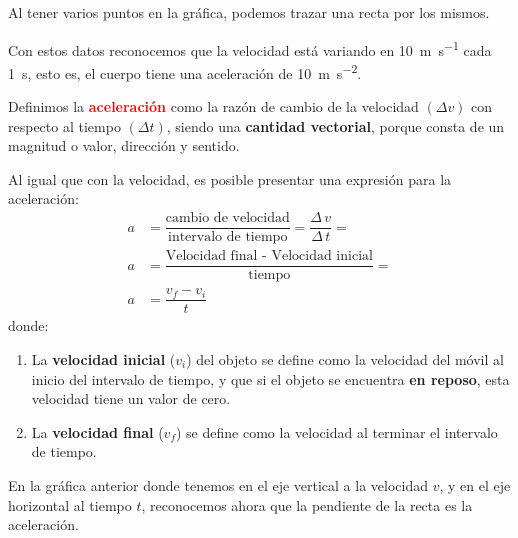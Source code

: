 \documentclass[14pt]{extarticle}
\newcommand{\textocolor}[2]{\textbf{\textcolor{#1}{#2}}}
\begin{document}
Al tener varios puntos en la gráfica, podemos trazar una recta por los mismos.
\begin{figure}[H]
    \centering
\end{figure}

Con estos datos reconocemos que la velocidad está variando en \SI{10}{\meter\per\second} cada \SI{1}{\second}, esto es, el cuerpo tiene una aceleración de \SI{10}{\meter\per\square\second}.

Definimos la \textocolor{red}{aceleración} como la razón de cambio de la velocidad $(\Delta v)$ con respecto al tiempo $(\Delta t)$, siendo una \textocolor{cerise}{cantidad vectorial}, porque consta de un magnitud o valor, dirección y sentido.

Al igual que con la velocidad, es posible presentar una expresión para la aceleración:
\begin{align*}
a &= \dfrac{\text{cambio de velocidad}}{\text{intervalo de tiempo}} =  \dfrac{\Delta \, v}{\Delta \, t} = \\[1em] 
a &= \dfrac{\text{Velocidad final - Velocidad inicial}}{\text{tiempo}} = \\[1em] 
a &= \dfrac{v_{f} - v_{i}}{t}
\end{align*}
donde:
\begin{enumerate}[label=\roman*)]
\item La \textocolor{cobalt}{velocidad inicial} ($v_{i}$) del objeto se define como la velocidad del móvil al inicio del intervalo de tiempo, y que si el objeto se encuentra \textocolor{byzantine}{en reposo}, esta velocidad tiene un valor de cero.
\item La \textocolor{bole}{velocidad final} ($v_{f}$) se define como la velocidad al terminar el intervalo de tiempo.
\end{enumerate}
En la gráfica anterior donde tenemos en el eje vertical a la velocidad $v$, y en el eje horizontal al tiempo $t$, reconocemos ahora que la pendiente de la recta es la aceleración.
\end{document}
